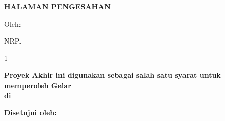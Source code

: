 \cleardoublepage
\pagestyle{empty} %

\DisableDocumentWatermark

\begin{center}
  {\fontsize{20}{0}\bfseries HALAMAN PENGESAHAN\par}
  \vspace{0.8cm}

  \begin{minipage}{1\textwidth}
    \centering
    \fontsize{18}{16}\bfseries\selectfont\MakeUppercase{\JudulPA}
  \end{minipage}
  \par

  \vspace{0.6cm}

  {\fontsize{14}{17}\selectfont Oleh:\par}
  \vspace{0.1cm}

  {\fontsize{14}{17}\bfseries
    \NamaMahasiswa\par
  NRP. \NRP\par}

  \vspace{0.6cm}

  \begin{spacing}{1}
    {\fontsize{14}{17}\bfseries
      Proyek Akhir ini digunakan sebagai salah satu syarat untuk\\
      memperoleh Gelar \GelarLulus\\
      di \NamaInstitusi\\
    \TahunLulus\par}
  \end{spacing}
\end{center}

\vspace{0.2cm}
\begin{center}
  {\fontsize{14}{17}\bfseries Disetujui oleh:}
\end{center}
\vspace{0.2cm}

